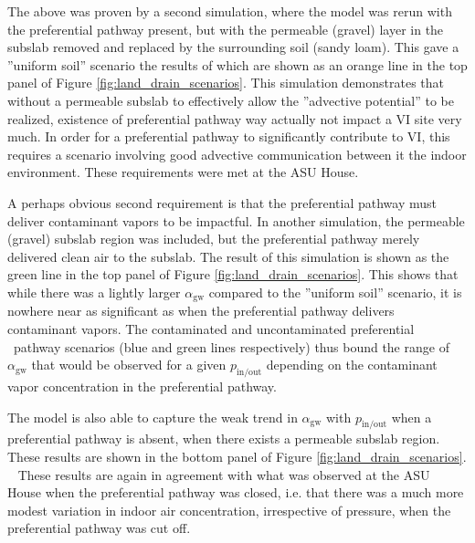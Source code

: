 \documentclass[journal=esthag,manuscript=article]{achemso}
\begin{document}
The above was proven by a second simulation, where the model was rerun with the preferential pathway present, but with the permeable (gravel) layer in the subslab removed and replaced by the surrounding soil (sandy loam).
This gave a ”uniform soil” scenario the results of which are shown as an orange line in the top panel of Figure \ref{fig:land_drain_scenarios}.
This simulation demonstrates that without a permeable subslab to effectively allow the ”advective potential” to be realized, existence of preferential pathway way actually not impact a VI site very much.
In order for a preferential pathway to significantly contribute to VI, this requires a scenario involving good advective communication between it the indoor environment.
These requirements were met at the ASU House.\par

A perhaps obvious second requirement is that the preferential pathway must deliver contaminant vapors to be impactful.
In another simulation, the permeable (gravel) subslab region was included, but the preferential pathway merely delivered clean air to the subslab.
The result of this simulation is shown as the green line in the top panel of Figure \ref{fig:land_drain_scenarios}.
This shows that while there was a lightly larger $\alpha_\mathrm{gw}$ compared to the ”uniform soil” scenario, it is nowhere near as significant as when the preferential pathway delivers contaminant vapors.
The contaminated and uncontaminated preferential  pathway scenarios (blue and green lines respectively) thus bound the range of $\alpha_\mathrm{gw}$ that would be observed for a given $p_\mathrm{in/out}$ depending on the contaminant vapor concentration in the preferential pathway.\par

The model is also able to capture the weak trend in $\alpha_\mathrm{gw}$ with $p_\mathrm{in/out}$ when a preferential pathway is absent, when there exists a permeable subslab region.
These results are shown in the bottom panel of Figure \ref{fig:land_drain_scenarios}.  
These results are again in agreement with what was observed at the ASU House when the preferential pathway was closed, i.e. that there was a much more modest variation in indoor air concentration, irrespective of pressure, when the preferential pathway was cut off.\par
\end{document}
